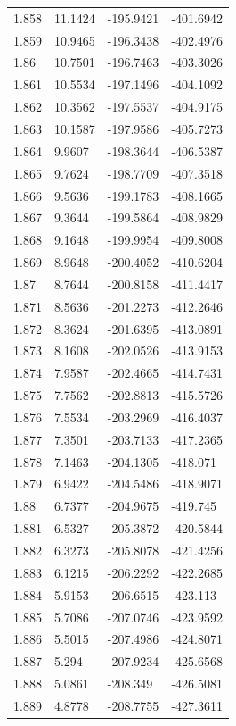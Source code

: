 \begin{tabular}{llll}
1.858 & 11.1424 & -195.9421 & -401.6942 \\
1.859 & 10.9465 & -196.3438 & -402.4976 \\
1.86 & 10.7501 & -196.7463 & -403.3026 \\
1.861 & 10.5534 & -197.1496 & -404.1092 \\
1.862 & 10.3562 & -197.5537 & -404.9175 \\
1.863 & 10.1587 & -197.9586 & -405.7273 \\
1.864 & 9.9607 & -198.3644 & -406.5387 \\
1.865 & 9.7624 & -198.7709 & -407.3518 \\
1.866 & 9.5636 & -199.1783 & -408.1665 \\
1.867 & 9.3644 & -199.5864 & -408.9829 \\
1.868 & 9.1648 & -199.9954 & -409.8008 \\
1.869 & 8.9648 & -200.4052 & -410.6204 \\
1.87 & 8.7644 & -200.8158 & -411.4417 \\
1.871 & 8.5636 & -201.2273 & -412.2646 \\
1.872 & 8.3624 & -201.6395 & -413.0891 \\
1.873 & 8.1608 & -202.0526 & -413.9153 \\
1.874 & 7.9587 & -202.4665 & -414.7431 \\
1.875 & 7.7562 & -202.8813 & -415.5726 \\
1.876 & 7.5534 & -203.2969 & -416.4037 \\
1.877 & 7.3501 & -203.7133 & -417.2365 \\
1.878 & 7.1463 & -204.1305 & -418.071 \\
1.879 & 6.9422 & -204.5486 & -418.9071 \\
1.88 & 6.7377 & -204.9675 & -419.745 \\
1.881 & 6.5327 & -205.3872 & -420.5844 \\
1.882 & 6.3273 & -205.8078 & -421.4256 \\
1.883 & 6.1215 & -206.2292 & -422.2685 \\
1.884 & 5.9153 & -206.6515 & -423.113 \\
1.885 & 5.7086 & -207.0746 & -423.9592 \\
1.886 & 5.5015 & -207.4986 & -424.8071 \\
1.887 & 5.294 & -207.9234 & -425.6568 \\
1.888 & 5.0861 & -208.349 & -426.5081 \\
1.889 & 4.8778 & -208.7755 & -427.3611 \\

\end{tabular}
